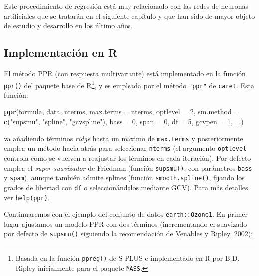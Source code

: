 \documentclass[
  spanish,
]{book}
\newenvironment{Shaded}{\begin{snugshade}}{\end{snugshade}}
\newcommand{\DataTypeTok}[1]{\textcolor[rgb]{0.13,0.29,0.53}{#1}}
\newcommand{\DecValTok}[1]{\textcolor[rgb]{0.00,0.00,0.81}{#1}}
\newcommand{\KeywordTok}[1]{\textcolor[rgb]{0.13,0.29,0.53}{\textbf{#1}}}
\newcommand{\NormalTok}[1]{#1}
\newcommand{\StringTok}[1]{\textcolor[rgb]{0.31,0.60,0.02}{#1}}
\theoremstyle{break}
\theoremstyle{definition}
\theoremstyle{definition}
\theoremstyle{definition}
\theoremstyle{remark}
\begin{document}
Este procedimiento de regresión está muy relacionado con las redes de neuronas artificiales que se tratarán en el siguiente capítulo y que han sido de mayor objeto de estudio y desarrollo en los último años.

\hypertarget{implementaciuxf3n-en-r-1}{%
\subsection{Implementación en R}\label{implementaciuxf3n-en-r-1}}

El método PPR (con respuesta multivariante) está implementado en la función \texttt{ppr()} del paquete base de R\footnote{Basada en la función \texttt{ppreg()} de S-PLUS e implementado en R por B.D. Ripley inicialmente para el paquete \texttt{MASS}.}, y es empleada por el método \texttt{"ppr"} de \texttt{caret}.
Esta función:

\begin{Shaded}
\begin{Highlighting}[]
\KeywordTok{ppr}\NormalTok{(formula, data, nterms, }\DataTypeTok{max.terms =}\NormalTok{ nterms, }\DataTypeTok{optlevel =} \DecValTok{2}\NormalTok{,}
    \DataTypeTok{sm.method =} \KeywordTok{c}\NormalTok{(}\StringTok{"supsmu"}\NormalTok{, }\StringTok{"spline"}\NormalTok{, }\StringTok{"gcvspline"}\NormalTok{),}
    \DataTypeTok{bass =} \DecValTok{0}\NormalTok{, }\DataTypeTok{span =} \DecValTok{0}\NormalTok{, }\DataTypeTok{df =} \DecValTok{5}\NormalTok{, }\DataTypeTok{gcvpen =} \DecValTok{1}\NormalTok{, ...)}
\end{Highlighting}
\end{Shaded}

va añadiendo términos \emph{ridge} hasta un máximo de \texttt{max.terms} y posteriormente emplea un método hacia atrás para seleccionar \texttt{nterms} (el argumento \texttt{optlevel} controla como se vuelven a reajustar los términos en cada iteración).
Por defecto emplea el \emph{super suavizador} de Friedman (función \texttt{supsmu()}, con parámetros \texttt{bass} y \texttt{spam}), aunque también admite splines (función \texttt{smooth.spline()}, fijando los grados de libertad con \texttt{df} o seleccionándolos mediante GCV).
Para más detalles ver \texttt{help(ppr)}.

Continuaremos con el ejemplo del conjunto de datos \texttt{earth::Ozone1}. En primer lugar ajustamos un modelo PPR con dos términos (incrementando el suavizado por defecto de \texttt{supsmu()} siguiendo la recomendación de Venables y Ripley, \protect\hyperlink{ref-Venables2002Modern}{2002}):
\end{document}
